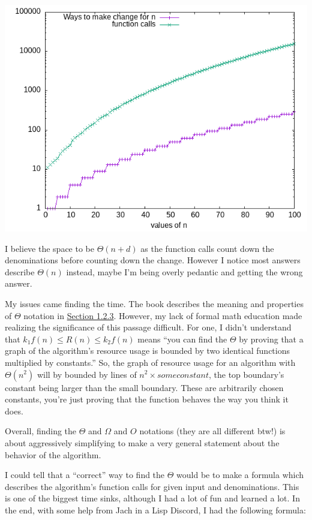 \documentclass[final,fleqn,titlepage]{article}
\begin{document}
\begin{center}
\includegraphics[width=.9\linewidth]{1/fig/cc-100.png}
\end{center}

I believe the space to be \(\Theta(n+d)\) as the function calls count down the
denominations before counting down the change. However I notice most answers
describe \(\Theta(n)\) instead, maybe I'm being overly pedantic and getting the
wrong answer.

My issues came finding the time. The book describes the meaning and properties
of \(\Theta\) notation in \href{http://sarabander.github.io/sicp/html/1\_002e2.xhtml\#g\_t1\_002e2\_002e3}{Section 1.2.3}. However, my lack of formal math
education made realizing the significance of this passage difficult. For one, I
didn't understand that \(k_{1}f(n) \leq R(n) \leq k_{2}f(n)\) means ``you can
find the \(\Theta\) by proving that a graph of the algorithm's resource usage is
bounded by two identical functions multiplied by constants.'' So, the graph of
resource usage for an algorithm with \(\Theta(n^{2})\) will by bounded by lines
of \(n^{2} \times some constant\), the top boundary's constant being larger than
the small boundary. These are arbitrarily chosen constants, you're just proving
that the function behaves the way you think it does.

Overall, finding the \(\Theta\) and \(\Omega\) and \(O\) notations (they are all
different btw!) is about aggressively simplifying to make a very general
statement about the behavior of the algorithm.

I could tell that a ``correct'' way to find the \(\Theta\) would be to make a
formula which describes the algorithm's function calls for given input and
denominations. This is one of the biggest time sinks, although I had a lot of
fun and learned a lot. In the end, with some help from Jach in a Lisp Discord, I
had the following formula:
\end{document}
